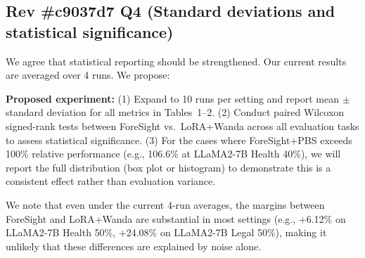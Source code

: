 \documentclass{article}
\begin{document}
\subsection*{Rev \#c9037d7 Q4 (Standard deviations and statistical significance)}

We agree that statistical reporting should be strengthened. Our current results are averaged over 4 runs. We propose:

\textbf{Proposed experiment:} (1) Expand to 10 runs per setting and report mean $\pm$ standard deviation for all metrics in Tables~1--2. (2) Conduct paired Wilcoxon signed-rank tests between ForeSight vs.\ LoRA+Wanda across all evaluation tasks to assess statistical significance. (3) For the cases where ForeSight+PBS exceeds 100\% relative performance (e.g., 106.6\% at LLaMA2-7B Health 40\%), we will report the full distribution (box plot or histogram) to demonstrate this is a consistent effect rather than evaluation variance.

We note that even under the current 4-run averages, the margins between ForeSight and LoRA+Wanda are substantial in most settings (e.g., +6.12\% on LLaMA2-7B Health 50\%, +24.08\% on LLaMA2-7B Legal 50\%), making it unlikely that these differences are explained by noise alone.
\end{document}
